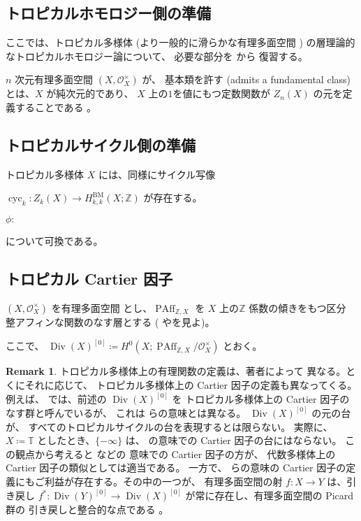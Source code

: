 \documentclass[a4paper,dvipdfmx,reqno,12pt]{amsart}
\theoremstyle{definition}
\newtheorem{remark}[theorem]{Remark}
\newcommand{\deq}{\coloneqq}
\newcommand{\opn}[1]{\operatorname{#1}}
\numberwithin{equation}{section}
\begin{document}
\subsection{トロピカルホモロジー側の準備}

ここでは、トロピカル多様体 
(より一般的に滑らかな有理多面空間
\cite[Definition 6.1]{MR4637248})
の層理論的なトロピカルホモロジー論について、
必要な部分を \cite{MR4637248} から
復習する。




$n$ 次元有理多面空間
$(X,\mathcal{O}_X^{\times})$ が、
基本類を許す
(admits a fundamental class)
とは、$X$ が純次元的であり、
$X$ 上の$1$を値にもつ定数関数が
$Z_n(X)$ の元を定義することである
\cite[]{MR4637248}。


\subsection{トロピカルサイクル側の準備}

トロピカル多様体 $X$ には、同様にサイクル写像

$\opn{cyc}_k\colon Z_k(X)\to H^{\mathrm{BM}}_{k,k}(X;\mathbb{Z})$
が存在する。

$
\phi \colon $

について可換である。
\cite[Lemma 5.13]{MR3894860}


\subsection{トロピカル Cartier 因子}

$(X,\mathcal{O}_X^{\times})$ を有理多面空間
とし、$\opn{PAff}_{\mathbb{Z},X}$ を
$X$ 上の$\mathbb{Z}$ 係数の傾きをもつ区分
整アフィンな関数のなす層とする
(\cite[Definition 4.1]{MR3894860}
や\cite[Definition 3.8 and Remark
3.9]{MR4246795}を見よ)。

ここで、
$\opn{Div}(X)^{[0]}\deq H^{0}(X;
\opn{PAff}_{\mathbb{Z},X}/\mathcal{O}_X^{\times})$
とおく。

\begin{remark}
トロピカル多様体上の有理関数の定義は、著者によって
異なる。とくにそれに応じて、
トロピカル多様体上の Cartier 因子の定義も異なってくる。
例えば、\cite{MR3894860,MR4637248}
では、前述の $\opn{Div}(X)^{[0]}$ を
トロピカル多様体上の Cartier 因子のなす群と呼んでいるが、
これは \cite{demedrano2023chern} らの意味とは異なる。
$\opn{Div}(X)^{[0]}$ の元の台が、
すべてのトロピカルサイクルの台を表現するとは限らない。
実際に、$X\deq \mathbb{T}$ としたとき、$\{-\infty\}$
は、\cite{MR3894860,MR4637248} の意味での
Cartier 因子の台にはならない。
この観点から考えると \cite{demedrano2023chern} などの
意味での Cartier 因子の方が、
代数多様体上の Cartier 因子の類似としては適当である。
一方で、\cite{MR3894860,MR4637248} らの意味の Cartier 
因子の定義にもご利益が存在する。その中の一つが、
有理多面空間の射 $f\colon X\to Y$ は、引き戻し
$f^{*}\colon \opn{Div}(Y)^{[0]} \to \opn{Div}(X)^{[0]}$
が常に存在し、有理多面空間の Picard 群の
引き戻しと整合的な点である
\cite[Propoisition 3.15]{MR4637248}。
\end{remark}
\end{document}
